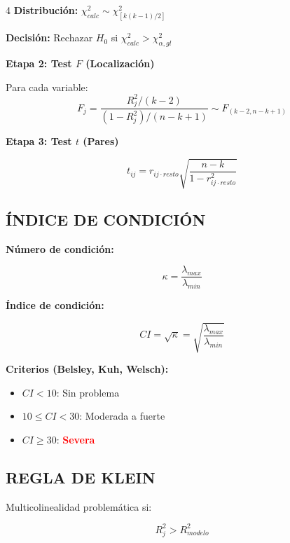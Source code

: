 \documentclass[6pt, landscape]{extarticle}
\begin{document}
\begin{multicols*}{4}
\textbf{Distribución:} $\chi^2_{calc} \sim \chi^2_{[k(k-1)/2]}$

\textbf{Decisión:} Rechazar $H_0$ si $\chi^2_{calc} > \chi^2_{\alpha,gl}$

\textbf{Etapa 2: Test $F$ (Localización)}

Para cada variable:
$$F_j = \frac{R_j^2/(k-2)}{(1-R_j^2)/(n-k+1)} \sim F_{(k-2,n-k+1)}$$

\textbf{Etapa 3: Test $t$ (Pares)}

$$t_{ij} = r_{ij \cdot resto} \sqrt{\frac{n-k}{1-r_{ij \cdot resto}^2}}$$


\subsection{ÍNDICE DE CONDICIÓN}

\textbf{Número de condición:}
\begin{formulabox}
\vspace{-3pt}
$$\kappa = \frac{\lambda_{max}}{\lambda_{min}}$$
\vspace{-3pt}
\end{formulabox}

\textbf{Índice de condición:}
\begin{formulabox}
\vspace{-3pt}
$$CI = \sqrt{\kappa} = \sqrt{\frac{\lambda_{max}}{\lambda_{min}}}$$
\vspace{-3pt}
\end{formulabox}

\textbf{Criterios (Belsley, Kuh, Welsch):}
\begin{itemize}
    \item $CI < 10$: Sin problema
    \item $10 \leq CI < 30$: Moderada a fuerte
    \item $CI \geq 30$: \textcolor{red}{\textbf{Severa}}
\end{itemize}

\subsection{REGLA DE KLEIN}

Multicolinealidad problemática si:
\begin{formulabox}
\vspace{-3pt}
$$R_j^2 > R^2_{modelo}$$
\vspace{-3pt}
\end{formulabox}


\end{multicols*}
\end{document}
